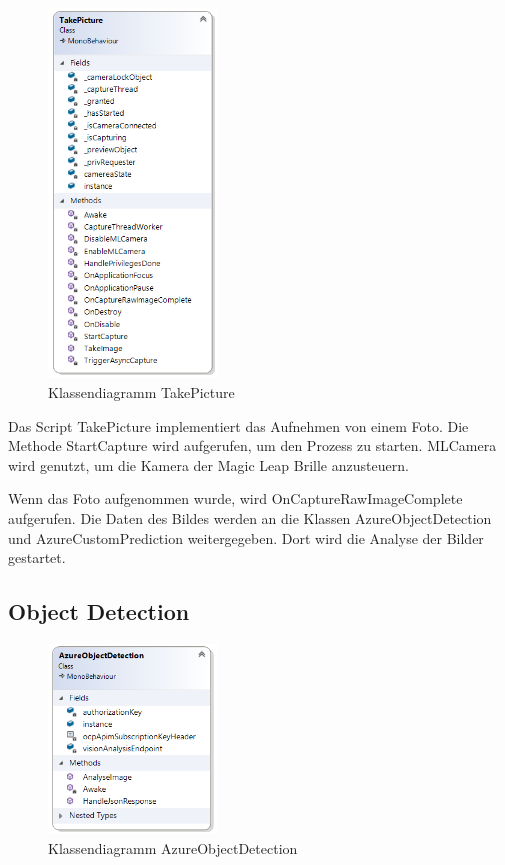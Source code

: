 \documentclass[german,a4paper, 12pt]{llncs}
\begin{document}
\begin{figure}[H]
	\centering
	\includegraphics[width=0.4\textwidth]{images/dia_takepicture.PNG}
	\caption[]{Klassendiagramm TakePicture}
	\label{dia:takepicture}
\end{figure}

Das Script TakePicture implementiert das Aufnehmen von einem Foto.
Die Methode StartCapture wird aufgerufen, um den Prozess zu starten. 
MLCamera wird genutzt, um die Kamera der Magic Leap Brille anzusteuern.


Wenn das Foto aufgenommen wurde, wird OnCaptureRawImageComplete aufgerufen. Die Daten des Bildes werden an die Klassen AzureObjectDetection und AzureCustomPrediction weitergegeben. Dort wird die Analyse der Bilder gestartet. 

\subsection{Object Detection}

\begin{figure}[H]
	\centering
	\includegraphics[width=0.4\textwidth]{images/dia_azureobjectdetection.PNG}
	\caption[]{Klassendiagramm AzureObjectDetection}
	\label{dia:azureobjectdetection}
\end{figure}
\end{document}
